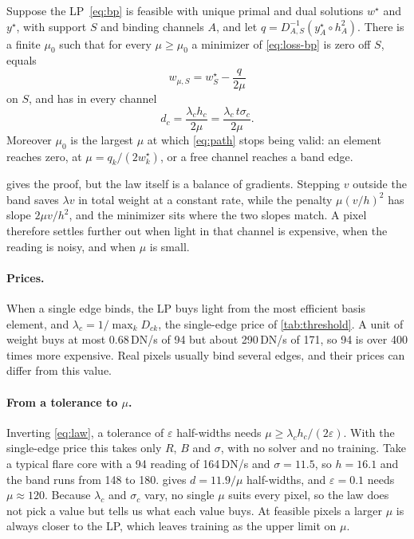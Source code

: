 \begin{proposition}
\label{prop:law}
Suppose the LP~\eqref{eq:bp} is feasible with unique primal and dual solutions $w^\star$ and $y^\star$, with support $S$ and binding channels $A$, and let $q=D_{A,S}^{-1}(y^\star_A\circ h_A^2)$. There is a finite $\mu_0$ such that for every $\mu\ge\mu_0$ a minimizer of \cref{eq:loss-bp} is zero off $S$, equals
\begin{equation}
  w_{\mu,S}=w^\star_S-\frac{q}{2\mu}
  \label{eq:path}
\end{equation}
on $S$, and has in every channel
\begin{equation}
  d_c=\frac{\lambda_c h_c}{2\mu}=\frac{\lambda_c\,t\sigma_c}{2\mu}.
  \label{eq:law}
\end{equation}
Moreover $\mu_0$ is the largest $\mu$ at which \cref{eq:path} stops being valid: an element reaches zero, at $\mu=q_k/(2w^\star_k)$, or a free channel reaches a band edge.
\end{proposition}

 gives the proof, but the law itself is a balance of gradients. Stepping $v$ outside the band saves $\lambda v$ in total weight at a constant rate, while the penalty $\mu(v/h)^2$ has slope $2\mu v/h^2$, and the minimizer sits where the two slopes match. A pixel therefore settles further out when light in that channel is expensive, when the reading is noisy, and when $\mu$ is small.

\paragraph{Prices.}
When a single edge binds, the LP buys light from the most efficient basis element, and $\lambda_c=1/\max_k D_{ck}$, the single-edge price of \cref{tab:threshold}. A unit of weight buys at most 0.68\,DN/s of 94\Ang{} but about 290\,DN/s of 171\Ang, so 94\Ang{} is over 400 times more expensive. Real pixels usually bind several edges, and their prices can differ from this value.

\paragraph{From a tolerance to $\mu$.}
Inverting \cref{eq:law}, a tolerance of $\varepsilon$ half-widths needs $\mu\ge\lambda_c h_c/(2\varepsilon)$. With the single-edge price this takes only $R$, $B$ and $\sigma$, with no solver and no training. Take a typical flare core with a 94\Ang{} reading of 164\,DN/s and $\sigma=11.5$, so $h=16.1$ and the band runs from 148 to 180.  gives $d=11.9/\mu$ half-widths, and $\varepsilon=0.1$ needs $\mu\approx120$. Because $\lambda_c$ and $\sigma_c$ vary, no single $\mu$ suits every pixel, so the law does not pick a value but tells us what each value buys. At feasible pixels a larger $\mu$ is always closer to the LP, which leaves training as the upper limit on $\mu$.

